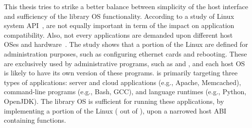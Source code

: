 This thesis tries to strike a better balance %
between simplicity of the host interface
and sufficiency of the library OS functionality. %
According to
a study of Linux system API~\cite{tsai16apistudy},
\linuxapis{} are not equally important in term of the impact on application compatibility.
Also, not every applications are demanded upon different host OSes and hardware~\cite{ubuntu-popularity}.
The study shows that
a portion of the Linux \linuxapis{} are defined for administration purposes,
such as configuring ethernet cards and rebooting.
These \linuxapis{} are exclusively used by
administrative programs,
such as  and ,
and each host OS is likely to have its own version of these programs.
\graphene{} is primarily targeting three types of applications:
server and cloud applications (e.g., Apache, Memcached), command-line programs (e.g., Bash, GCC), and language runtimes (e.g., Python, OpenJDK).
The \graphene{} library OS is sufficient for running these applications,
by implementing a portion of the Linux \linuxapis{} (\graphenesyscallnum{} out of \linuxsyscallnum{}),
upon a narrowed host ABI containing \palcallnum{} functions.









